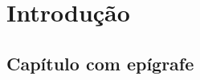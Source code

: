 \part{Introdução}
	
\chapter{Capítulo com epígrafe}

\blindtext

\begin{citacaoLonga}
    \blindtext
\end{citacaoLonga}

\blindtext
\blinddocument